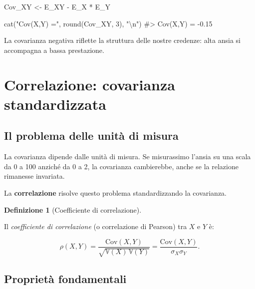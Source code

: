 \documentclass[
  italian,
  letterpaper,
  a4paper,
  11pt,
  open=any]{scrbook}
\newenvironment{Shaded}{\begin{snugshade}}{\end{snugshade}}
\newcommand{\CommentTok}[1]{\textcolor[rgb]{0.37,0.37,0.37}{#1}}
\newcommand{\DecValTok}[1]{\textcolor[rgb]{0.68,0.00,0.00}{#1}}
\newcommand{\FunctionTok}[1]{\textcolor[rgb]{0.28,0.35,0.67}{#1}}
\newcommand{\NormalTok}[1]{\textcolor[rgb]{0.00,0.23,0.31}{#1}}
\newcommand{\OtherTok}[1]{\textcolor[rgb]{0.00,0.23,0.31}{#1}}
\newcommand{\SpecialCharTok}[1]{\textcolor[rgb]{0.37,0.37,0.37}{#1}}
\newcommand{\StringTok}[1]{\textcolor[rgb]{0.13,0.47,0.30}{#1}}
\theoremstyle{plain}
\theoremstyle{definition}
\theoremstyle{definition}
\newtheorem{definition}{Definizione}[chapter]
\theoremstyle{remark}
\begin{document}
\begin{tcolorbox}
\begin{Shaded}
\begin{Highlighting}[]
\NormalTok{Cov\_XY }\OtherTok{\textless{}{-}}\NormalTok{ E\_XY }\SpecialCharTok{{-}}\NormalTok{ E\_X }\SpecialCharTok{*}\NormalTok{ E\_Y}

\FunctionTok{cat}\NormalTok{(}\StringTok{"Cov(X,Y) ="}\NormalTok{, }\FunctionTok{round}\NormalTok{(Cov\_XY, }\DecValTok{3}\NormalTok{), }\StringTok{"}\SpecialCharTok{\textbackslash{}n}\StringTok{"}\NormalTok{)}
\CommentTok{\#\textgreater{} Cov(X,Y) = {-}0.15}
\end{Highlighting}
\end{Shaded}

La covarianza negativa riflette la struttura delle nostre credenze: alta
ansia si accompagna a bassa prestazione.

\end{tcolorbox}

\section{Correlazione: covarianza standardizzata}\label{sec-correlation}

\subsection{Il problema delle unità di
misura}\label{il-problema-delle-unituxe0-di-misura}

La covarianza dipende dalle unità di misura. Se misurassimo l'ansia su
una scala da 0 a 100 anziché da 0 a 2, la covarianza cambierebbe, anche
se la relazione rimanesse invariata.

La \textbf{correlazione} risolve questo problema standardizzando la
covarianza.

\begin{definition}[Coefficiente di
correlazione]\protect\hypertarget{def-correlation}{}\label{def-correlation}

Il \emph{coefficiente di correlazione} (o correlazione di Pearson) tra
\(X\) e \(Y\) è:

\[
\rho(X,Y) = \frac{\text{Cov}(X,Y)}{\sqrt{\mathbb{V}(X)\,\mathbb{V}(Y)}} = \frac{\text{Cov}(X,Y)}{\sigma_X \sigma_Y}.
\]

\end{definition}

\subsection{Proprietà fondamentali}\label{proprietuxe0-fondamentali}
\end{document}

